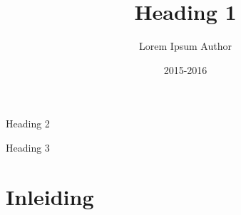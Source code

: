 \documentclass[11pt, a4paper, oneside]{book}
\title{Heading 1}
\date{2015-2016}
\author{Lorem Ipsum Author}
\newcommand{\subtitle}{Heading 2}
\newcommand{\subsubtitle}{Heading 3}
\begin{document}

	\begin{titlepage}

				 \AddToShipoutPicture*{\BackgroundPic}

				\vspace*{130mm}

				\begin{flushright}
				\bf
				\color{oranjerood}
				{
					\scshape	
					\huge
					\selectfont
					\thetitle
				}

				\vspace{0mm}
				\LARGE
				\subtitle
				\end{flushright}
				\vspace{\fill}
				{\color{blauwgroen} \subsubtitle}

				\newpage

	\end{titlepage}


\tableofcontents

\newpage



\chapter{Inleiding}
\end{document}
